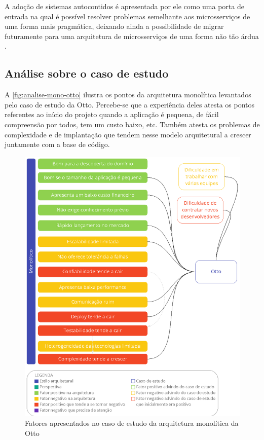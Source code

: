 A adoção de sistemas autocontidos é apresentada por ele como uma porta de entrada na qual é possível
resolver problemas semelhante aos microsserviços de uma forma mais pragmática, deixando ainda a
possibilidade de migrar futuramente para uma arquitetura de microsserviços de uma forma não tão
árdua \cite{Guido2016:WhyMicroservices}.
    
\subsection{Análise sobre o caso de estudo}

A \autoref{fig:analise-mono-otto} ilustra os pontos da arquitetura monolítica levantados pelo
caso de estudo da Otto. Percebe-se que a experiência deles atesta os pontos referentes ao início do
projeto quando a aplicação é pequena, de fácil compreensão por todos, tem um custo baixo, etc.
Também atesta os problemas de complexidade e de implantação que tendem nesse modelo arquitetural a
crescer juntamente com a base de código.


\begin{figure}[h]
  \centering
  \includegraphics[keepaspectratio=true,scale=1]{figuras/monoOtto.eps}
  \caption{Fatores apresentados no caso de estudo da arquitetura monolítica da Otto\label{fig:analise-mono-otto}}
\end{figure}

